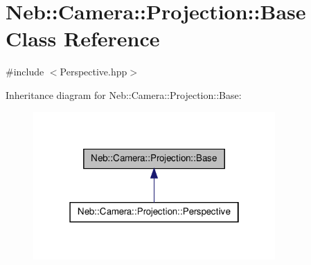 \hypertarget{classNeb_1_1Camera_1_1Projection_1_1Base}{\section{\-Neb\-:\-:\-Camera\-:\-:\-Projection\-:\-:\-Base \-Class \-Reference}
\label{classNeb_1_1Camera_1_1Projection_1_1Base}
}


 




{\ttfamily \#include $<$\-Perspective.\-hpp$>$}



\-Inheritance diagram for \-Neb\-:\-:\-Camera\-:\-:\-Projection\-:\-:\-Base\-:
\nopagebreak
\begin{figure}[H]
\begin{center}
\leavevmode
\includegraphics[width=262pt]{classNeb_1_1Camera_1_1Projection_1_1Base__inherit__graph}
\end{center}
\end{figure}
